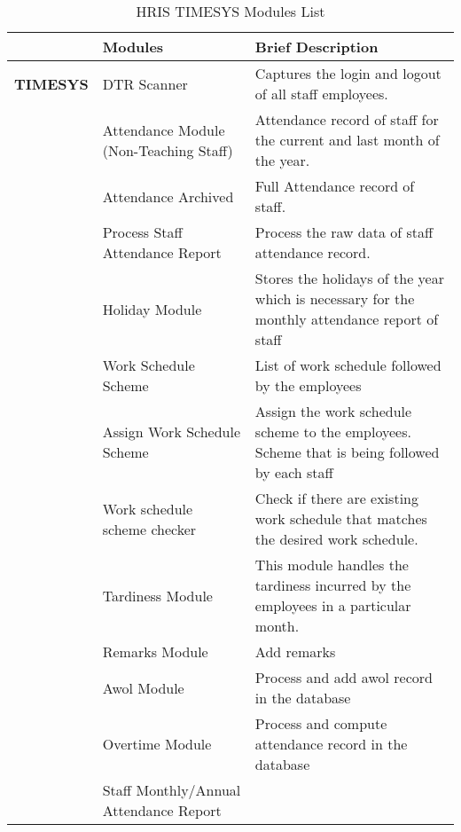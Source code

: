 \begin{table}[H]
\begin{tabular}{@{}p{2cm}p{3.5cm}p{9cm}@{}}
\toprule
\multicolumn{1}{l}{} & \textbf{Modules}                       & \textbf{Brief Description}                                                                    \\ \midrule
\textbf{TIMESYS}     & DTR Scanner                            & Captures the login and logout of all staff employees.                                         \\
                        & Attendance Module (Non-Teaching Staff) & Attendance record of staff for the current and last month of the year.                        \\
                        & Attendance Archived                    & Full Attendance record of staff.                                                              \\
                        & Process Staff Attendance Report        & Process the raw data of staff attendance record.                                              \\
                        & Holiday Module                         & Stores the holidays of the year which is necessary for the monthly attendance report of staff \\
                        & Work Schedule Scheme                   & List of work schedule followed by the employees                                               \\
                        & Assign Work Schedule Scheme            & Assign the work schedule scheme to the employees. Scheme that is being followed by each staff \\
                        & Work schedule scheme checker           & Check if there are existing work schedule that matches the desired work schedule.             \\
                        & Tardiness Module                       & This module handles the tardiness incurred by the employees in a particular month.            \\
                        & Remarks Module                         & Add remarks                                                                                   \\
                        & Awol Module                            & Process and add awol record in the database                                                   \\
                        & Overtime Module                        & Process and compute attendance record in the database                                         \\
                        & Staff Monthly/Annual Attendance Report &                                                                                               \\ \bottomrule
\end{tabular}
\caption{HRIS TIMESYS Modules List}
\label{tab:hris-timesys-modules}
\end{table}

